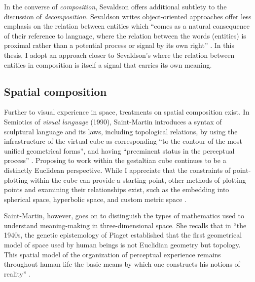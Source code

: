 In the converse of \textit{composition}, Sevaldson offers additional subtlety to the discussion of \textit{decomposition}. Sevaldson writes object-oriented approaches offer less emphasis on the relation between entities which ``comes as a natural consequence of their reference to language, where the relation between the words (entities) is proximal rather than a potential process or signal by its own right” \citep[p. 168-169]{sevaldson_designing_2022}. In this thesis, I adopt an approach closer to Sevaldson’s where the relation between entities in composition is itself a signal that carries its own meaning.


\subsection{Spatial composition}
Further to visual experience in space, treatments on spatial composition exist. In Semiotics of \textit{visual language} (1990), Saint-Martin introduces a syntax of sculptural language and its laws, including topological relations, by using the infrastructure of the virtual cube as corresponding ``to the contour of the most unified geometrical forms”, and having ``preeminent status in the perceptual process” \citep[p. 173-174]{saint-martin_semiotics_1990}. Proposing to work within the gestaltian cube continues to be a distinctly Euclidean perspective. While I appreciate that the constraints of point-plotting within the cube can provide a starting point, other methods of plotting points and examining their relationships exist, such as the embedding into spherical space, hyperbolic space, and custom metric space \citep{mcinnes_embedding_2018}.

Saint-Martin, however, goes on to distinguish the types of mathematics used to understand meaning-making in three-dimensional space. She recalls that in ``the 1940s, the genetic epistemology of Piaget established that the first geometrical model of space used by human beings is not Euclidian geometry but topology. This spatial model of the organization of perceptual experience remains throughout human life the basic means by which one constructs his notions of reality” \citep[p. 68]{saint-martin_semiotics_1990}. 

